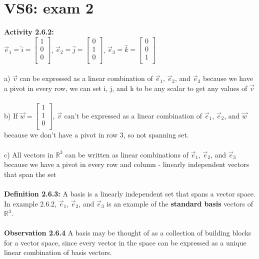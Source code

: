 \documentclass{article}
\begin{document}
{\section{VS6: exam 2}
\textbf{Activity 2.6.2:}\\
$\vec{e}_{1} = \hat{i} = \begin{bmatrix} 
1\\ 
0\\
0\\
\end{bmatrix}$, $\vec{e}_{2} = \hat{j} =\begin{bmatrix} 
0\\ 
1\\
0\\
\end{bmatrix}$, $\vec{e}_{3} = \hat{k} =\begin{bmatrix} 
0\\ 
0\\
1\\
\end{bmatrix}$\\
\\
a) $\vec{v}$ can be expressed as a linear combination of $\vec{e}_{1}$, $\vec{e}_{2}$, and $\vec{e}_{3}$ because we have a pivot in every row, we can set i, j, and k to be any scalar to get any values of $\vec{v}$ \\
\\
b) If $\vec{w} = \begin{bmatrix} 
1\\ 
1\\
0\\
\end{bmatrix}$, $\vec{v}$ can't be expressed as a linear combination of $\vec{e}_{1}$, $\vec{e}_{2}$, and $\vec{w}$ because we don't have a pivot in row 3, so not spanning set. \\
\\
c) All vectors in $\mathbb{R}^{3}$ can be written as linear combinations of $\vec{e}_{1}$, $\vec{e}_{2}$, and $\vec{e}_{3}$  because we have a pivot in every row and column - linearly independent vectors that span the set\\
\\
\textbf{Definition 2.6.3:} A basis is a linearly independent set that spans a vector space. In example 2.6.2, $\vec{e}_{1}$, $\vec{e}_{2}$, and $\vec{e}_{3}$ is an example of the \textbf{standard basis} vectors of $\mathbb{R}^{3}$.\\
\\
\textbf{Observation 2.6.4} A basis may be thought of as a collection of building blocks for a vector space, since every vector in the space can be expressed as a unique linear combination of basis vectors.\\
}
\end{document}

